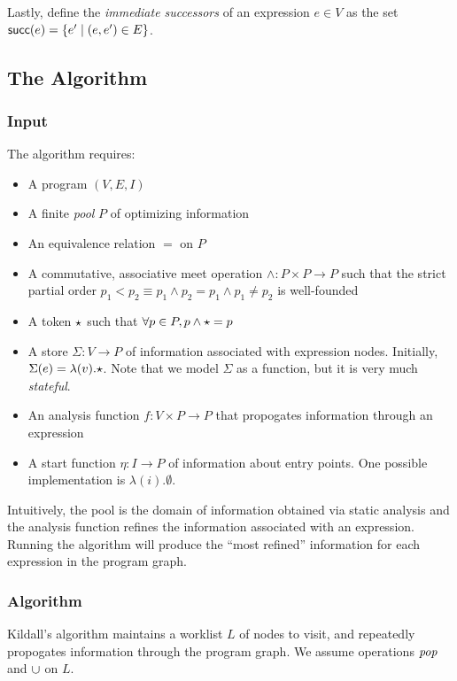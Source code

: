 \documentclass{article}
\begin{document}
Lastly, define the \emph{immediate successors} of an expression $e \in V$ as the set $\mathsf{succ}(e) = \{ e' \mid (e, e') \in E\}$.


\subsection*{The Algorithm}
\subsubsection*{Input}
\label{input}

The algorithm requires:
\begin{itemize}
\item A program $(V, E, I)$
\item A finite \emph{pool} $P$ of optimizing information
\item An equivalence relation $=$ on $P$
\item A commutative, associative meet operation $\wedge : P \times P \rightarrow P$
      such that the strict partial order $p_1 < p_2 \equiv p_1 \wedge p_2 = p_1 \wedge p_1 \neq p_2$ is well-founded
\item A token $\star$ such that $\forall p \in P, p \wedge \star = p$
\item A store $\Sigma : V \rightarrow P$ of information associated with expression nodes.
      Initially, $\Sigma(e) = \lambda(v). \star$.
      Note that we model $\Sigma$ as a function, but it is very much \emph{stateful}.
\item An analysis function $f : V \times P \rightarrow P$ that propogates information through an expression
\item A start function $\eta : I \rightarrow P$ of information about entry points.
      One possible implementation is $\lambda(i). \emptyset$.
\end{itemize}

Intuitively, the pool is the domain of information obtained via static analysis and the analysis function refines the information associated with an expression.
Running the algorithm will produce the ``most refined'' information for each expression in the program graph.


\subsubsection*{Algorithm}
\label{algorithm}

Kildall's algorithm maintains a worklist $L$ of nodes to visit, and repeatedly propogates information through the program graph.
We assume operations $\emph{pop}$ and $\cup$ on $L$.
\end{document}
